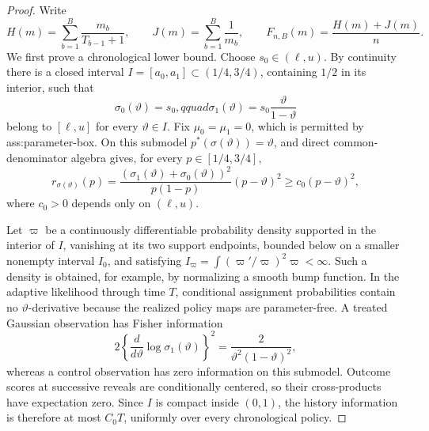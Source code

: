 \documentclass{article}
\begin{document}
\begin{proof}
Write
\[
H(m)=\sum_{b=1}^B\frac{m_b}{T_{b-1}+1},\qquad
J(m)=\sum_{b=1}^B\frac1{m_b},\qquad
F_{n,B}(m)=\frac{H(m)+J(m)}n.
\]
We first prove a chronological lower bound.  Choose \(s_0\in(\ell,u)\).  By continuity there is a closed interval \(I=[a_0,a_1]\subset(1/4,3/4)\), containing \(1/2\) in its interior, such that
\[
\sigma_0(\vartheta)=s_0,qquad
\sigma_1(\vartheta)=s_0\frac{\vartheta}{1-\vartheta}
\]
belong to \([\ell,u]\) for every \(\vartheta\in I\).  Fix \(\mu_0=\mu_1=0\), which is permitted by ass:parameter-box.  On this submodel \(p^*(\sigma(\vartheta))=\vartheta\), and direct common-denominator algebra gives, for every \(p\in[1/4,3/4]\),
\[
r_{\sigma(\vartheta)}(p)
=\frac{(\sigma_1(\vartheta)+\sigma_0(\vartheta))^2}
 {p(1-p)}(p-\vartheta)^2
\geq c_0(p-\vartheta)^2,                                      \tag{1}
\]
where \(c_0>0\) depends only on \((\ell,u)\).

Let \(\varpi\) be a continuously differentiable probability density supported in the interior of \(I\), vanishing at its two support endpoints, bounded below on a smaller nonempty interval \(I_0\), and satisfying
\(I_\varpi=\int(\varpi'/\varpi)^2\varpi<\infty\).  Such a density is obtained, for example, by normalizing a smooth bump function.  In the adaptive likelihood through time \(T\), conditional assignment probabilities contain no \(\vartheta\)-derivative because the realized policy maps are parameter-free.  A treated Gaussian observation has Fisher information
\[
2\left\{\frac{d}{d\vartheta}\log\sigma_1(\vartheta)\right\}^2
=\frac{2}{\vartheta^2(1-\vartheta)^2},
\]
whereas a control observation has zero information on this submodel.  Outcome scores at successive reveals are conditionally centered, so their cross-products have expectation zero.  Since \(I\) is compact inside \((0,1)\), the history information is therefore at most \(C_0T\), uniformly over every chronological policy.


\end{proof}
\end{document}
